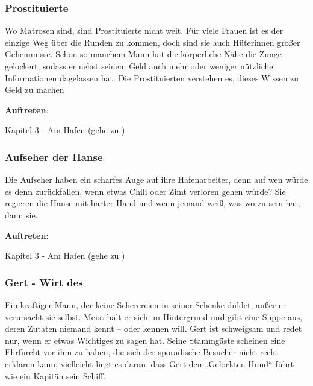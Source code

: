 \subsubsection*{Prostituierte}
\label{Prostituierte}

Wo Matrosen sind, sind Prostituierte nicht weit. Für viele Frauen ist es der einzige Weg über die Runden zu kommen, doch sind sie auch Hüterinnen großer Geheimnisse. Schon so manchem Mann hat die körperliche Nähe die Zunge gelockert, sodass er nebst seinem Geld auch mehr oder weniger nützliche Informationen dagelassen hat. Die Prostituierten verstehen es, dieses Wissen zu Geld zu machen


\textbf{Auftreten}:

Kapitel 3 - Am Hafen (gehe zu \blue{\ref{Hafen}})

\subsubsection*{Aufseher der Hanse}
\label{Aufseher}

Die Aufseher haben ein scharfes Auge auf ihre Hafenarbeiter, denn auf wen würde es denn zurückfallen, wenn etwas Chili oder Zimt verloren gehen würde? Sie regieren die Hanse mit harter Hand und wenn jemand weiß, was wo zu sein hat, dann sie.


\textbf{Auftreten}:

Kapitel 3 - Am Hafen (gehe zu \blue{\ref{Hafen}})

\subsubsection*{Gert - Wirt des }
\label{Gert}

Ein kräftiger Mann, der keine Scherereien in seiner Schenke duldet, außer er verursacht sie selbst. Meist hält er sich im Hintergrund und gibt eine Suppe aus, deren Zutaten niemand kennt – oder kennen will. Gert ist schweigsam und redet nur, wenn er etwas Wichtiges zu sagen hat. Seine Stammgäste scheinen eine Ehrfurcht vor ihm zu haben, die sich der sporadische Besucher nicht recht erklären kann; vielleicht liegt es daran, dass Gert den „Gelockten Hund“ führt wie ein Kapitän sein Schiff.

